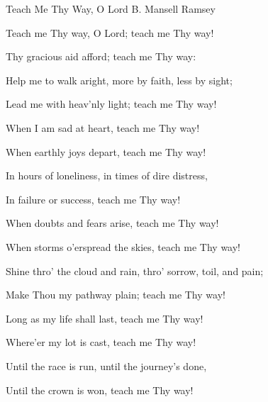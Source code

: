 \documentclass[12pt]{book}
\begin{document}
\begin{song}{Teach Me Thy Way, O Lord}{}
  {\SBPubDom}
  {B. Mansell Ramsey}
  {}
  {}

  \begin{SBVerse}
    Teach me Thy way, O Lord; teach me Thy way!

    Thy gracious aid afford; teach me Thy way:

    Help me to walk aright, more by faith, less by sight;

    Lead me with heav'nly light; teach me Thy way!
  \end{SBVerse}

  \begin{SBVerse}
    When I am sad at heart, teach me Thy way!

    When earthly joys depart, teach me Thy way!

    In hours of loneliness, in times of dire distress,

    In failure or success, teach me Thy way!
  \end{SBVerse}

  \begin{SBVerse}
    When doubts and fears arise, teach me Thy way!

    When storms o'erspread the skies, teach me Thy way!

    Shine thro' the cloud and rain, thro' sorrow, toil, and pain;

    Make Thou my pathway plain; teach me Thy way!
  \end{SBVerse}

  \begin{SBVerse}
    Long as my life shall last, teach me Thy way!

    Where'er my lot is cast, teach me Thy way!

    Until the race is run, until the journey's done,

    Until the crown is won, teach me Thy way!
  \end{SBVerse}
\end{song}
\end{document}
